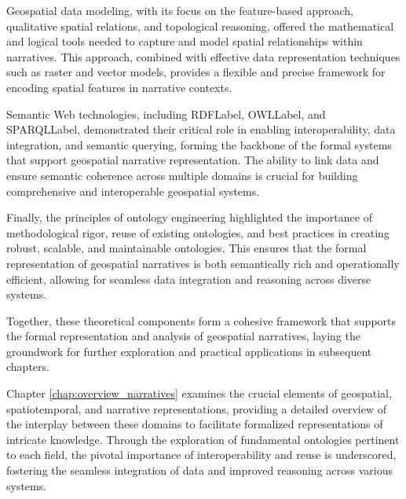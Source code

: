 Geospatial data modeling, with its focus on the feature-based approach, qualitative spatial relations, and topological reasoning, offered the mathematical and logical tools needed to capture and model spatial relationships within narratives. This approach, combined with effective data representation techniques such as raster and vector models, provides a flexible and precise framework for encoding spatial features in narrative contexts.

Semantic Web technologies, including \acrshort{RDFLabel}, \acrshort{OWLLabel}, and \acrshort{SPARQLLabel}, demonstrated their critical role in enabling interoperability, data integration, and semantic querying, forming the backbone of the formal systems that support geospatial narrative representation. The ability to link data and ensure semantic coherence across multiple domains is crucial for building comprehensive and interoperable geospatial systems.

Finally, the principles of ontology engineering highlighted the importance of methodological rigor, reuse of existing ontologies, and best practices in creating robust, scalable, and maintainable ontologies. This ensures that the formal representation of geospatial narratives is both semantically rich and operationally efficient, allowing for seamless data integration and reasoning across diverse systems.

Together, these theoretical components form a cohesive framework that supports the formal representation and analysis of geospatial narratives, laying the groundwork for further exploration and practical applications in subsequent chapters.

Chapter \ref{chap:overview_narratives} examines the crucial elements of geospatial, spatiotemporal, and narrative representations, providing a detailed overview of the interplay between these domains to facilitate formalized representations of intricate knowledge. Through the exploration of fundamental ontologies pertinent to each field, the pivotal importance of interoperability and reuse is underscored, fostering the seamless integration of data and improved reasoning across various systems.
